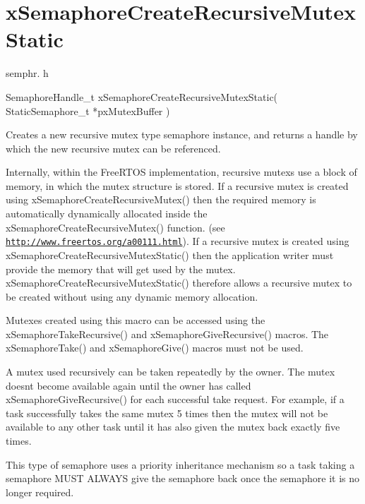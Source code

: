\hypertarget{group__x_semaphore_create_recursive_mutex_static}{}\section{x\+Semaphore\+Create\+Recursive\+Mutex\+Static}
\label{group__x_semaphore_create_recursive_mutex_static}
semphr. h 
\begin{DoxyPre}SemaphoreHandle\_t xSemaphoreCreateRecursiveMutexStatic( StaticSemaphore\_t *pxMutexBuffer )\end{DoxyPre}


Creates a new recursive mutex type semaphore instance, and returns a handle by which the new recursive mutex can be referenced.

Internally, within the Free\+R\+T\+OS implementation, recursive mutexs use a block of memory, in which the mutex structure is stored. If a recursive mutex is created using x\+Semaphore\+Create\+Recursive\+Mutex() then the required memory is automatically dynamically allocated inside the x\+Semaphore\+Create\+Recursive\+Mutex() function. (see \href{http://www.freertos.org/a00111.html}{\tt http\+://www.\+freertos.\+org/a00111.\+html}). If a recursive mutex is created using x\+Semaphore\+Create\+Recursive\+Mutex\+Static() then the application writer must provide the memory that will get used by the mutex. x\+Semaphore\+Create\+Recursive\+Mutex\+Static() therefore allows a recursive mutex to be created without using any dynamic memory allocation.

Mutexes created using this macro can be accessed using the x\+Semaphore\+Take\+Recursive() and x\+Semaphore\+Give\+Recursive() macros. The x\+Semaphore\+Take() and x\+Semaphore\+Give() macros must not be used.

A mutex used recursively can be \textquotesingle{}taken\textquotesingle{} repeatedly by the owner. The mutex doesn\textquotesingle{}t become available again until the owner has called x\+Semaphore\+Give\+Recursive() for each successful \textquotesingle{}take\textquotesingle{} request. For example, if a task successfully \textquotesingle{}takes\textquotesingle{} the same mutex 5 times then the mutex will not be available to any other task until it has also \textquotesingle{}given\textquotesingle{} the mutex back exactly five times.

This type of semaphore uses a priority inheritance mechanism so a task \textquotesingle{}taking\textquotesingle{} a semaphore M\+U\+ST A\+L\+W\+A\+YS \textquotesingle{}give\textquotesingle{} the semaphore back once the semaphore it is no longer required.

